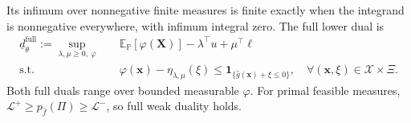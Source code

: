 Its infimum over nonnegative finite measures is finite exactly when the integrand is nonnegative everywhere, with infimum integral zero. The full lower dual is
\begin{equation}
  \begin{aligned}
    \underline d_\theta^{\mathrm{full}}:=\sup_{\lambda,\mu\ge0,\ \varphi}\quad&
    \mathbb E_{\mathbb P}\left[\varphi(\bm X)\right]-\lambda^\top u+\mu^\top\ell\\
    \text{s.t.}\quad&\varphi(\bm x)-\eta_{\lambda,\mu}(\xi)
    \le\mathbf1_{\{\hat g(\bm x)+\xi\le0\}},
    \quad\forall(\bm x,\xi)\in\mathcal X\times\Xi.
  \end{aligned}
  \label{eq-lower-measure-dual}
\end{equation}
Both full duals range over bounded measurable $\varphi$. For primal feasible measures, $\mathcal L^+\ge p_{\hat f}(\Pi)\ge\mathcal L^-$, so full weak duality holds.

